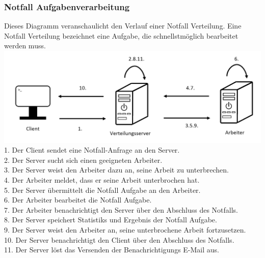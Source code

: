 \documentclass[a4paper,12pt]{article}
\begin{document}
\subsubsection{Notfall Aufgabenverarbeitung}
Dieses Diagramm veranschaulicht den Verlauf einer Notfall Verteilung. Eine Notfall Verteilung bezeichnet eine \gls{Aufgabe}, die schnellstmöglich bearbeitet werden muss.\\
\includegraphics[width=\linewidth]{Systemmodelle/Models/Emergency-Scheduling.PNG}
\\
1. Der \gls{Client} sendet eine Notfall-Anfrage an den \gls{Server}.\\
2. Der \gls{Server} sucht sich einen geeigneten \gls{Arbeiter}.\\
3. Der \gls{Server} weist den \gls{Arbeiter} dazu an, seine Arbeit zu unterbrechen.\\
4. Der \gls{Arbeiter} meldet, dass er seine Arbeit unterbrochen hat.\\
5. Der \gls{Server} übermittelt die Notfall \gls{Aufgabe} an den \gls{Arbeiter}.\\
6. Der \gls{Arbeiter} bearbeitet die Notfall \gls{Aufgabe}.\\
7. Der \gls{Arbeiter} benachrichtigt den \gls{Server} über den Abschluss des Notfalls.\\
8. Der \gls{Server} speichert \glspl{Statistik} und Ergebnis der Notfall \gls{Aufgabe}.\\
9. Der \gls{Server} weist den \gls{Arbeiter} an, seine unterbrochene Arbeit fortzusetzen.\\
10. Der \gls{Server} benachrichtigt den \gls{Client} über den Abschluss des Notfalls.\\
11. Der \gls{Server} löst das Versenden der Benachrichtigungs E-Mail aus.

\clearpage
\end{document}
